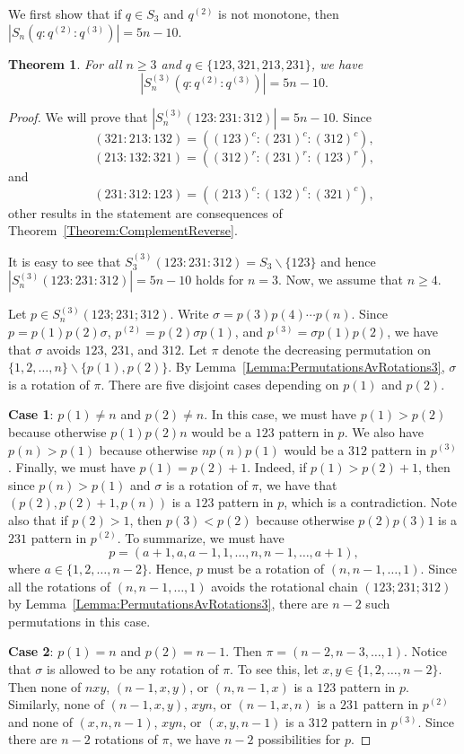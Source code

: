 \documentclass[11pt]{article}
\newtheorem{theorem}{Theorem}[section]
\theoremstyle{definition}
\numberwithin{equation}{section}
\begin{document}
We first show that if $q\in S_3$ and $q^{(2)}$ is not monotone, then $|S_n(q:q^{(2)}:q^{(3)})|=5n-10$.
\begin{theorem}\label{Theorem:3ChainLinear}
For all $n\geq3$ and $q\in\{123,321,213,231\}$, we have
\[
|S_n^{(3)}(q:q^{(2)}:q^{(3)})|=5n-10.
\]
\end{theorem}
\begin{proof}
We will prove that $|S_n^{(3)}(123:231:312)|=5n-10$. Since
\[
(321:213:132)=((123)^c:(231)^c:(312)^c),
\]
\[
(213:132:321)=((312)^r:(231)^r:(123)^r),
\]
and
\[
(231:312:123)=((213)^c:(132)^c:(321)^c),
\]
other results in the statement are consequences of Theorem~\ref{Theorem:ComplementReverse}. 

It is easy to see that $S_3^{(3)}(123:231:312)=S_3\backslash\{123\}$ and hence $|S_n^{(3)}(123:231:312)|=5n-10$ holds for $n=3$. Now, we assume that $n\geq4$.

Let $p\in S_n^{(3)}(123;231;312)$. Write $\sigma=p(3)p(4)\cdots p(n)$. Since $p=p(1)p(2)\sigma$, $p^{(2)}=p(2)\sigma p(1)$, 
and $p^{(3)}=\sigma p(1)p(2)$, we have that $\sigma$ avoids $123$, $231$, and $312$. Let $\pi$ denote the decreasing permutation on $\{1,2,\ldots,n\}\backslash\{p(1),p(2)\}$. By Lemma~\ref{Lemma:PermutationsAvRotations3}, $\sigma$ is a rotation of $\pi$. There are five 
disjoint cases depending on $p(1)$ and $p(2)$.

{\bf Case 1}:
$p(1)\neq n$ and $p(2)\neq n$. In this case, we must have $p(1)>p(2)$ because otherwise $p(1)p(2)n$ would be a $123$ pattern in $p$. We also have $p(n)>p(1)$ because otherwise $np(n)p(1)$ would be a $312$ pattern in $p^{(3)}$.
Finally, we must have $p(1)=p(2)+1$. Indeed, if $p(1)>p(2)+1$, then since $p(n)>p(1)$ and $\sigma$ is a rotation of $\pi$, we have that $(p(2),p(2)+1,p(n))$ is a $123$ pattern in $p$, which is a contradiction. Note also that if $p(2)>1$, then $p(3)<p(2)$ because otherwise $p(2)p(3)1$ is a $231$ pattern in $p^{(2)}$. To summarize, we must have 
\[
p=(a+1,a,a-1,1,\ldots,n,n-1,\ldots,a+1),
\]
where $a \in \{1,2, \dots, n-2\}$. Hence, $p$ must be a rotation of $(n,n-1,\ldots,1)$. Since all the rotations of $(n,n-1,\ldots,1)$ avoids the rotational chain $(123;231;312)$ by Lemma~\ref{Lemma:PermutationsAvRotations3}, there are $n-2$ such permutations in this case.


{\bf Case 2}: $p(1)=n$ and $p(2)=n-1$. Then $\pi=(n-2,n-3,\ldots,1)$. Notice that $\sigma$ is allowed to be any rotation of $\pi$. To see this, let $x,y\in\{1,2,\ldots,n-2\}$. Then none of $nxy$, $(n-1,x,y)$, or $(n,n-1,x)$ is a $123$ pattern in $p$. 
Similarly, none of $(n-1,x,y)$, $xyn$, or $(n-1,x,n)$ is a $231$ pattern in $p^{(2)}$ and none of $(x,n,n-1)$, $xyn$, or $(x,y,n-1)$ is a $312$ pattern in $p^{(3)}$. Since there are $n-2$ rotations of $\pi$, we have $n-2$ possibilities for $p$.


\end{proof}
\end{document}
